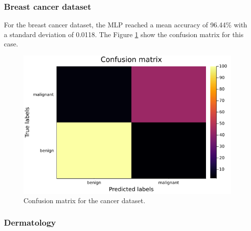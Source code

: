 \documentclass[12pt,a4paper]{article}
\begin{document}
\subsubsection{Breast cancer dataset}

For the breast cancer dataset, the MLP reached a mean accuracy of 96.44\% with a standard deviation of 0.0118. The Figure \ref{fig:cancer-mlp-confusion-matrix} show the confusion matrix for this case.
\begin{figure}[H]
    \centering
    \includegraphics[clip,scale=0.4]{../trab5 (MLP)/figs/mama-cancer-confusion-matrix.png}
    \caption{Confusion matrix for the cancer dataset.}
    \label{fig:cancer-mlp-confusion-matrix}
\end{figure}

\subsubsection{Dermatology}
\end{document}
